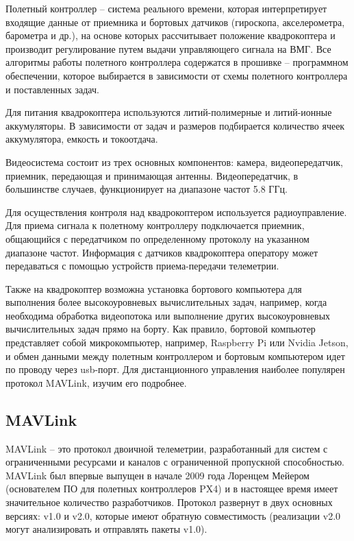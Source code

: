 Полетный контроллер -- система реального времени, которая интерпретирует входящие данные от приемника и бортовых датчиков (гироскопа, акселерометра, барометра и др.), на основе которых рассчитывает положение квадрокоптера и производит регулирование путем выдачи управляющего сигнала на ВМГ. Все алгоритмы работы полетного контроллера содержатся в прошивке -- программном обеспечении, которое выбирается в зависимости от схемы полетного контроллера и поставленных задач.

Для питания квадрокоптера используются литий-полимерные и литий-ионные аккумуляторы. В зависимости от задач и размеров подбирается количество ячеек аккумулятора, емкость и токоотдача.

Видеосистема состоит из трех основных компонентов: камера, видеопередатчик, приемник, передающая и принимающая антенны. Видеопередатчик, в большинстве случаев, функционирует на диапазоне частот 5.8 ГГц.

Для осуществления контроля над квадрокоптером используется радиоуправление. Для приема сигнала к полетному контроллеру подключается приемник, общающийся с передатчиком по определенному протоколу на указанном диапазоне частот. Информация с датчиков квадрокоптера оператору может передаваться с помощью устройств приема-передачи телеметрии.

Также на квадрокоптер возможна установка бортового компьютера для выполнения более высокоуровневых вычислительных задач, например, когда необходима обработка видеопотока или выполнение других высокоуровневых вычислительных задач прямо на борту. Как правило, бортовой компьютер представляет собой микрокомпьютер, например, Ras\-pber\-ry Pi или Nvi\-dia Jet\-son, и обмен данными между полетным контроллером и бортовым компьютером идет по проводу через usb-порт. Для дистанционного управления наиболее популярен протокол MAVLink, изучим его подробнее.

\subsection{MAVLink}

MAVLink -- это протокол двоичной телеметрии, разработанный для систем с ограниченными ресурсами и каналов с ограниченной пропускной способностью. MAVLink был впервые выпущен в начале 2009 года Лоренцем Мейером (основателем ПО для полетных контроллеров PX4) и в настоящее время имеет значительное количество разработчиков. Протокол развернут в двух основных версиях: v1.0 и v2.0, которые имеют обратную совместимость (реализации v2.0 могут анализировать и отправлять пакеты v1.0).

